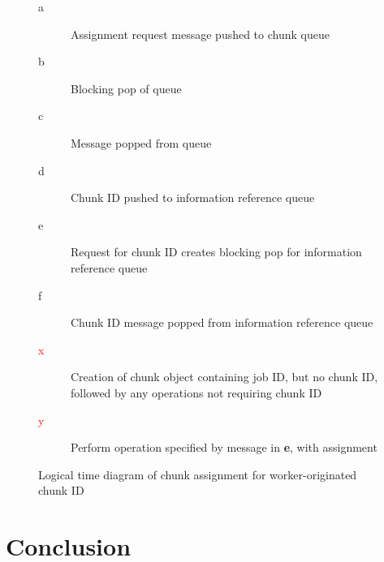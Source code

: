 \documentclass[a4paper,10pt]{article}
\begin{document}
\begin{figure}
	\begin{minipage}{0.4\textwidth}
	\end{minipage}
	\begin{minipage}{0.6\textwidth}
		\begin{description}
			\item [a] Assignment request message pushed to chunk
				queue
			\item [b] Blocking pop of queue
			\item [c] Message popped from queue
			\item [d] Chunk ID pushed to information reference
				queue
			\item [e] Request for chunk ID creates blocking pop for
				information reference queue
			\item [f] Chunk ID message popped from information
				reference queue
			\item [\textcolor{red}{x}] Creation of chunk object
				containing job ID, but no chunk ID, followed by
				any operations not requiring chunk ID
			\item [\textcolor{red}{y}] Perform operation specified
				by message in \textbf{e}, with assignment
		\end{description}
	\end{minipage}
	\caption{\label{fig:w-o-td}Logical time diagram of chunk assignment for
	worker-originated chunk ID}
\end{figure}

\section{Conclusion}
\end{document}
